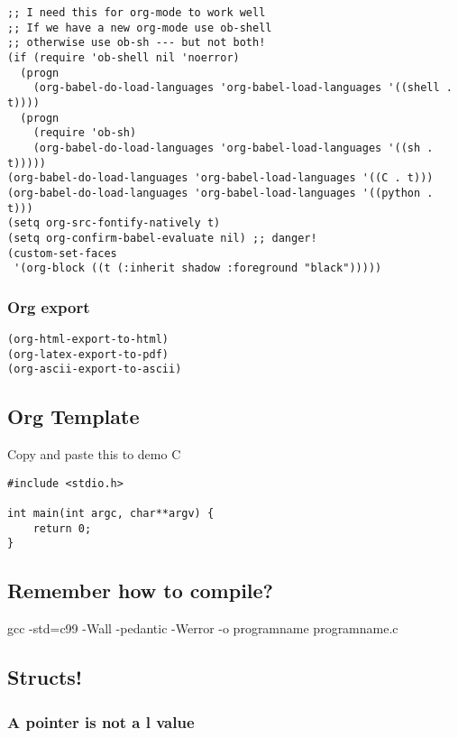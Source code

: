 \documentclass[11pt]{article}
\begin{document}
\begin{verbatim}
;; I need this for org-mode to work well
;; If we have a new org-mode use ob-shell
;; otherwise use ob-sh --- but not both!
(if (require 'ob-shell nil 'noerror)
  (progn
    (org-babel-do-load-languages 'org-babel-load-languages '((shell . t))))
  (progn
    (require 'ob-sh)
    (org-babel-do-load-languages 'org-babel-load-languages '((sh . t)))))
(org-babel-do-load-languages 'org-babel-load-languages '((C . t)))
(org-babel-do-load-languages 'org-babel-load-languages '((python . t)))
(setq org-src-fontify-natively t)
(setq org-confirm-babel-evaluate nil) ;; danger!
(custom-set-faces
 '(org-block ((t (:inherit shadow :foreground "black")))))
\end{verbatim}

\subsubsection{Org export}
\label{sec:orgf65fbea}
\begin{verbatim}
(org-html-export-to-html)
(org-latex-export-to-pdf)
(org-ascii-export-to-ascii)
\end{verbatim}


\subsection{Org Template}
\label{sec:orgce362ee}
Copy and paste this to demo C

\begin{verbatim}
#include <stdio.h>

int main(int argc, char**argv) {
    return 0;
}
\end{verbatim}

\subsection{Remember how to compile?}
\label{sec:org688b202}

gcc -std=c99 -Wall -pedantic -Werror -o programname programname.c

\subsection{Structs!}
\label{sec:org842a97e}
\subsubsection{A pointer is not a l value}
\label{sec:orgb420adb}
\end{document}
